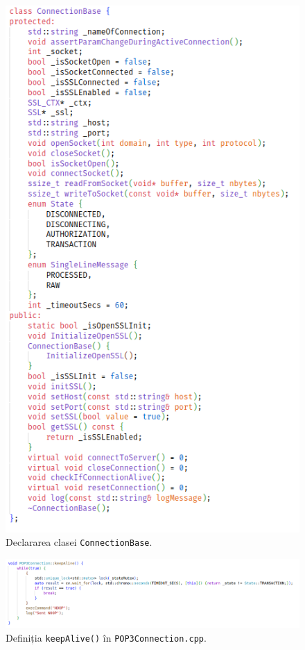 \documentclass[runningheads]{llncs}
\begin{document}
\begin{figure}
    \centering
    \includegraphics[width=\textwidth]{connectionBase.png}
    \caption{Declararea clasei \texttt{ConnectionBase}.}
    \label{fig:connectionBase}
\end{figure}

\begin{figure}
    \centering
    \includegraphics[width=\textwidth]{keepAlive.png}
    \caption{Definiția \texttt{keepAlive()} în \texttt{POP3Connection.cpp}.}
    \label{fig:keepalive}
\end{figure}
\end{document}
